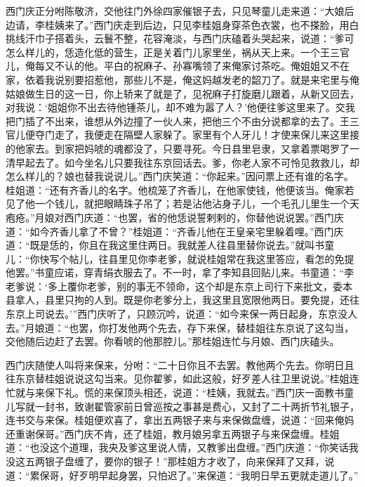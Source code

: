 西门庆正分咐陈敬济，交他往门外徐四家催银子去，只见琴童儿走来道：“大娘后边请，李桂姨来了。”西门庆走到后边，只见李桂姐身穿茶色衣裳，也不搽脸，用白挑线汗巾子搭着头，云鬟不整，花容淹淡，与西门庆磕着头哭起来，说道：“爹可怎么样儿的，恁造化低的营生，正是关着门儿家里坐，祸从天上来。一个王三官儿，俺每又不认的他。平白的祝麻子、孙寡嘴领了来俺家讨茶吃。俺姐姐又不在家，依着我说别要招惹他，那些儿不是，俺这妈越发老的韶刀了。就是来宅里与俺姑娘做生日的这一日，你上轿来了就是了，见祝麻子打旋磨儿跟着，从新又回去，对我说：‘姐姐你不出去待他锺茶儿，却不难为嚣了人？’他便往爹这里来了。交我把门插了不出来，谁想从外边撞了一伙人来，把他三个不由分说都拿的去了。王三官儿便夺门走了，我便走在隔壁人家躲了。家里有个人牙儿！才使来保儿来这里接的他家去。到家把妈唬的魂都没了，只要寻死。今日县里皂隶，又拿着票喝罗了一清早起去了。如今坐名儿只要我往东京回话去。爹，你老人家不可怜见救救儿，却怎么样儿的？娘也替我说说儿。”西门庆笑道：“你起来。”因问票上还有谁的名字。桂姐道：“还有齐香儿的名字。他梳笼了齐香儿，在他家使钱，他便该当。俺家若见了他一个钱儿，就把眼睛珠子吊了；若是沾他沾身子儿，一个毛孔儿里生一个天疱疮。”月娘对西门庆道：“也罢，省的他恁说誓剌剌的，你替他说说罢。”西门庆道：“如今齐香儿拿了不曾？”桂姐道：“齐香儿他在王皇亲宅里躲着哩。”西门庆道：“既是恁的，你且在我这里住两日。我就差人往县里替你说去。”就叫书童儿：“你快写个帖儿，往县里见你李老爹，就说桂姐常在我这里答应，看怎的免提他罢。”书童应诺，穿青绢衣服去了。不一时，拿了李知县回贴儿来。书童道：“李老爹说：‘多上覆你老爹，别的事无不领命，这个却是东京上司行下来批文，委本县拿人，县里只拘的人到。既是你老爹分上，我这里且宽限他两日。要免提，还往东京上司说去。’”西门庆听了，只顾沉吟，说道：“如今来保一两日起身，东京没人去。”月娘道：“也罢，你打发他两个先去，存下来保，替桂姐往东京说了这勾当，交他随后边赶了去罢。你看唬的他那腔儿。”那桂姐连忙与月娘、西门庆磕头。

西门庆随使人叫将来保来，分咐：“二十日你且不去罢。教他两个先去。你明日且往东京替桂姐说说这勾当来。见你翟爹，如此这般，好歹差人往卫里说说。”桂姐连忙就与来保下礼。慌的来保顶头相还，说道：“桂姨，我就去。”西门庆一面教书童儿写就一封书，致谢翟管家前日曾巡按之事甚是费心，又封了二十两折节礼银子，连书交与来保。桂姐便欢喜了，拿出五两银子来与来保做盘缠，说道：“回来俺妈还重谢保哥。”西门庆不肯，还了桂姐，教月娘另拿五两银子与来保盘缠。桂姐道：“也没这个道理，我央及爹这里说人情，又教爹出盘缠。”西门庆道：“你笑话我没这五两银子盘缠了，要你的银子！”那桂姐方才收了，向来保拜了又拜，说道：“累保哥，好歹明早起身罢，只怕迟了。”来保道：“我明日早五更就走道儿了。”

